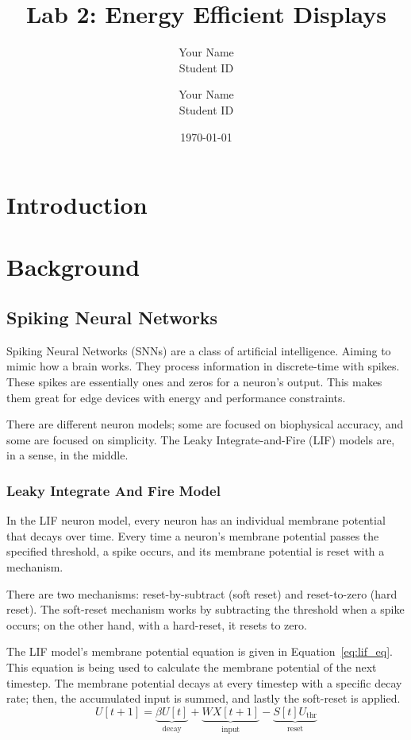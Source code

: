\documentclass[11pt,a4paper]{article}
\title{Lab 2: Energy Efficient Displays}
\author{Your Name \\ Student ID}
\author{Your Name \\ Student ID}
\date{\today}
\begin{document}
\maketitle


\section{Introduction}

\section{Background}

\subsection{Spiking Neural Networks}

Spiking Neural Networks (SNNs) are a class of artificial intelligence. Aiming to mimic how a brain works.
They process information in discrete-time with spikes. These spikes are essentially ones and zeros for a neuron's output.
This makes them great for edge devices with energy and performance constraints.

There are different neuron models; some are focused on biophysical accuracy, and some are focused on simplicity.
The Leaky Integrate-and-Fire (LIF) models are, in a sense, in the middle.

\subsubsection{Leaky Integrate And Fire Model}

In the LIF neuron model, every neuron has an individual membrane potential that decays over time.
Every time a neuron's membrane potential passes the specified threshold, a spike occurs, and its membrane potential is reset with a mechanism.

There are two mechanisms: reset-by-subtract (soft reset) and reset-to-zero (hard reset).
The soft-reset mechanism works by subtracting the threshold when a spike occurs; on the other hand, with a hard-reset, it resets to zero.

The LIF model's membrane potential equation is given in Equation~\ref{eq:lif_eq}. This equation is being used to calculate the membrane potential of the next timestep.
The membrane potential decays at every timestep with a specific decay rate; then, the accumulated input is summed, and lastly the soft-reset is applied. 
\begin{equation}
    U[t+1] = \underbrace{\beta U[t]}_{\text{decay}} + \underbrace{W X[t+1]}_{\text{input}} - \underbrace{S[t] U_{\text{thr}}}_{\text{reset}}
    \label{eq:lif_eq}
\end{equation}
\end{document}
